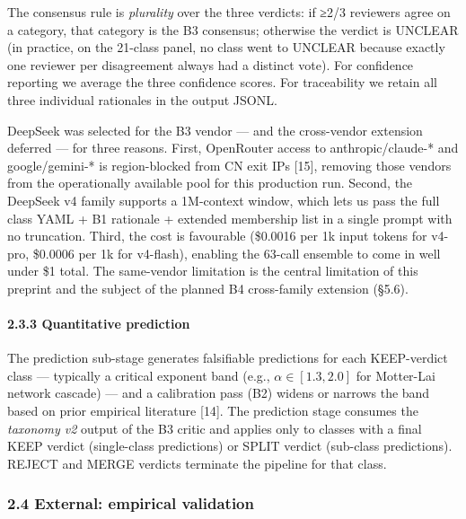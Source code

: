 \documentclass[
  letterpaper,
  11pt]{article}
\begin{document}
The consensus rule is \emph{plurality} over the three verdicts: if ≥2/3
reviewers agree on a category, that category is the B3 consensus;
otherwise the verdict is UNCLEAR (in practice, on the 21-class panel, no
class went to UNCLEAR because exactly one reviewer per disagreement
always had a distinct vote). For confidence reporting we average the
three confidence scores. For traceability we retain all three individual
rationales in the output JSONL.

DeepSeek was selected for the B3 vendor --- and the cross-vendor
extension deferred --- for three reasons. First, OpenRouter access to
anthropic/claude-* and google/gemini-* is region-blocked from CN exit
IPs {[}15{]}, removing those vendors from the operationally available
pool for this production run. Second, the DeepSeek v4 family supports a
1M-context window, which lets us pass the full class YAML + B1 rationale
+ extended membership list in a single prompt with no truncation. Third,
the cost is favourable (\$0.0016 per 1k input tokens for v4-pro,
\$0.0006 per 1k for v4-flash), enabling the 63-call ensemble to come in
well under \$1 total. The same-vendor limitation is the central
limitation of this preprint and the subject of the planned B4
cross-family extension (§5.6).

\paragraph{2.3.3 Quantitative prediction}\label{quantitative-prediction}

The prediction sub-stage generates falsifiable predictions for each
KEEP-verdict class --- typically a critical exponent band (e.g.,
\(\alpha \in [1.3, 2.0]\) for Motter-Lai network cascade) --- and a
calibration pass (B2) widens or narrows the band based on prior
empirical literature {[}14{]}. The prediction stage consumes the
\emph{taxonomy v2} output of the B3 critic and applies only to classes
with a final KEEP verdict (single-class predictions) or SPLIT verdict
(sub-class predictions). REJECT and MERGE verdicts terminate the
pipeline for that class.

\subsubsection{2.4 External: empirical
validation}\label{external-empirical-validation}
\end{document}
